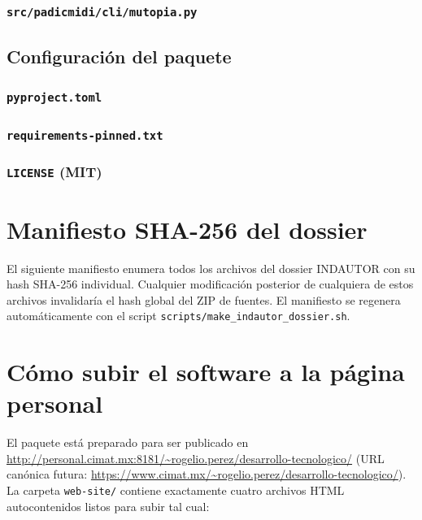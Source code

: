 \documentclass[11pt,a4paper,oneside]{article}
\theoremstyle{plain}
\theoremstyle{definition}
\theoremstyle{remark}
\newcommand{\code}[1]{\texttt{\small #1}}
\begin{document}
\subsubsection{\code{src/padicmidi/cli/mutopia.py}}


\subsection{Configuración del paquete}

\subsubsection{\code{pyproject.toml}}


\subsubsection{\code{requirements-pinned.txt}}


\subsubsection{\code{LICENSE} (MIT)}


\section{Manifiesto SHA-256 del dossier}\label{app:manifest}

El siguiente manifiesto enumera todos los archivos del dossier INDAUTOR
con su hash SHA-256 individual. Cualquier modificación posterior de
cualquiera de estos archivos invalidaría el hash global del ZIP de
fuentes. El manifiesto se regenera automáticamente con el script
\code{scripts/make\_indautor\_dossier.sh}.



\section{Cómo subir el software a la página personal}\label{app:upload}

El paquete está preparado para ser publicado en
\url{http://personal.cimat.mx:8181/~rogelio.perez/desarrollo-tecnologico/}
(URL canónica futura: \url{https://www.cimat.mx/~rogelio.perez/desarrollo-tecnologico/}).
La carpeta \code{web-site/} contiene exactamente cuatro archivos HTML
autocontenidos listos para subir tal cual:
\end{document}

